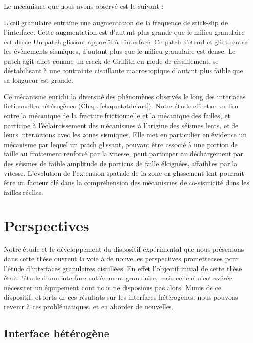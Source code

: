 \pagebreak

Le mécanisme que nous avons observé est le suivant :
\begin{itemize}
\bitem L'œil granulaire entraîne une augmentation de la fréquence de stick-slip de l'interface. Cette augmentation est d'autant plus grande que le milieu granulaire est dense
\bitem Un patch glissant apparaît à l'interface. Ce patch s'étend et glisse entre les évènements sismiques, d'autant plus que le milieu granulaire est dense.
\bitem Le patch agit alors comme un crack de Griffith en mode de cisaillement, se déstabilisant à une contrainte cisaillante macroscopique d'autant plus faible que sa longueur est grande.
\end{itemize}
Ce mécanisme enrichi la diversité des phénomènes observés le long des interfaces fictionnelles hétérogènes (Chap.\,\ref{chap:etatdelart}). Notre étude effectue un lien entre la mécanique de la fracture frictionnelle et la mécanique des failles, et participe à l'éclaircissement des mécanismes à l'origine des séismes lents, et de leurs interactions avec les zones sismiques. Elle met en particulier en évidence un mécanisme par lequel un patch glissant, pouvant être associé à une portion de faille au frottement renforcé par la vitesse, peut participer au déchargement par des séismes de faible amplitude de portions de faille éloignées, affaiblies par la vitesse. L'évolution de l'extension spatiale de la zone en glissement lent pourrait être un facteur clé dans la compréhension des mécanismes de co-sismicité dans les failles réelles.




\section{Perspectives}


Notre étude et le développement du dispositif expérimental que nous présentons dans cette thèse ouvrent la voie à de nouvelles perspectives prometteuses pour l'étude d'interfaces granulaires cisaillées. En effet l'objectif initial de cette thèse était l'étude d'une interface entièrement granulaire, mais celle-ci s'est avérée nécessiter un équipement dont nous ne disposions pas alors. Munis de ce dispositif, et forts de ces résultats sur les interfaces hétérogènes, nous pouvons revenir à ces problématiques, et en aborder de nouvelles.


\subsection{Interface hétérogène}

